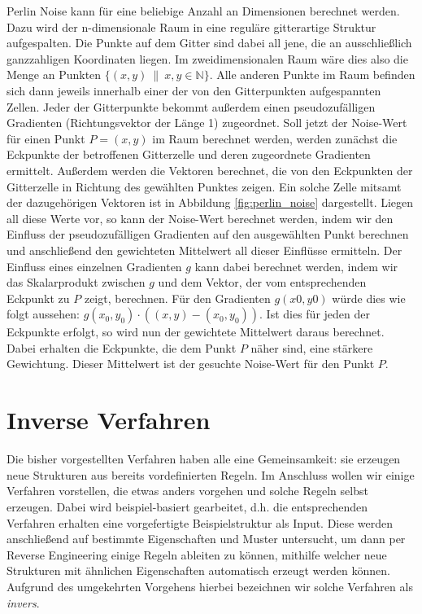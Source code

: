 Perlin Noise kann für eine beliebige Anzahl an Dimensionen berechnet werden. Dazu wird der n-dimensionale Raum in eine reguläre gitterartige
Struktur aufgespalten. Die Punkte auf dem Gitter sind dabei all jene, die an ausschließlich ganzzahligen Koordinaten liegen. Im zweidimensionalen
Raum wäre dies also die Menge an Punkten \(\{(x, y) \ \| \ x, y \in \mathbb{N}\}\). Alle anderen Punkte im Raum befinden sich dann jeweils innerhalb
einer der von den Gitterpunkten aufgespannten Zellen. Jeder der Gitterpunkte bekommt außerdem einen pseudozufälligen Gradienten (Richtungsvektor
der Länge 1) zugeordnet. Soll jetzt der Noise-Wert für einen Punkt \(P = (x, y)\) im Raum berechnet werden, werden zunächst die Eckpunkte der
betroffenen Gitterzelle und deren zugeordnete Gradienten ermittelt. Außerdem werden die Vektoren berechnet, die von den Eckpunkten der Gitterzelle
in Richtung des gewählten Punktes zeigen. Ein solche Zelle mitsamt der dazugehörigen Vektoren ist in Abbildung \ref{fig:perlin_noise} dargestellt.
Liegen all diese Werte vor, so kann der Noise-Wert berechnet werden, indem wir den Einfluss der pseudozufälligen Gradienten auf den ausgewählten
Punkt berechnen und anschließend den gewichteten Mittelwert all dieser Einflüsse ermitteln. Der Einfluss eines einzelnen Gradienten \(g\) kann
dabei berechnet werden, indem wir das Skalarprodukt zwischen \(g\) und dem Vektor, der vom entsprechenden Eckpunkt zu \(P\) zeigt, berechnen.
Für den Gradienten \(g(x0,y0)\) würde dies wie folgt aussehen: \(g(x_0,y_0) \cdot ((x,y)-(x_0,y_0))\). Ist dies für jeden der Eckpunkte erfolgt,
so wird nun der gewichtete Mittelwert daraus berechnet. Dabei erhalten die Eckpunkte, die dem Punkt \(P\) näher sind, eine stärkere Gewichtung.
Dieser Mittelwert ist der gesuchte Noise-Wert für den Punkt \(P\). \cite{43_zucker}

\section{Inverse Verfahren}
Die bisher vorgestellten Verfahren haben alle eine Gemeinsamkeit: sie erzeugen neue Strukturen aus bereits vordefinierten Regeln. Im Anschluss
wollen wir einige Verfahren vorstellen, die etwas anders vorgehen und solche Regeln selbst erzeugen. Dabei wird beispiel-basiert gearbeitet,
d.h. die entsprechenden Verfahren erhalten eine vorgefertigte Beispielstruktur als Input. Diese werden anschließend auf bestimmte Eigenschaften und
Muster untersucht, um dann per Reverse Engineering einige Regeln ableiten zu können, mithilfe welcher neue Strukturen mit ähnlichen Eigenschaften
automatisch erzeugt werden können. Aufgrund des umgekehrten Vorgehens hierbei bezeichnen wir solche Verfahren als \textit{invers}.


